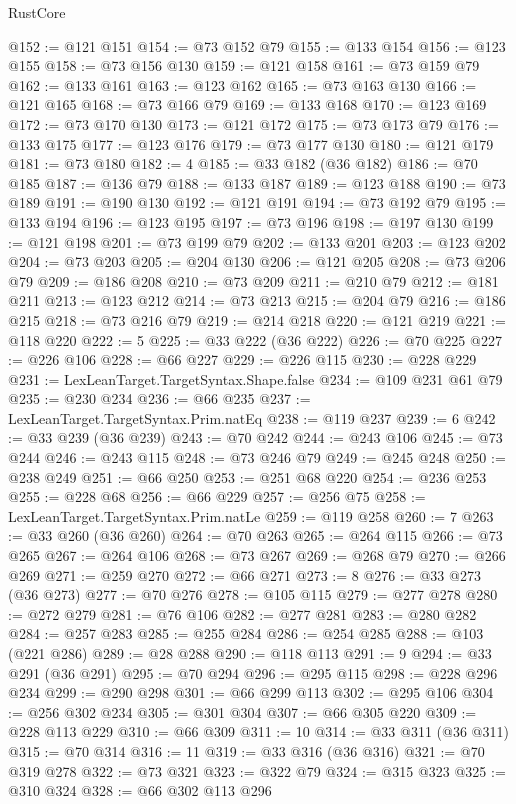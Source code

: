 \begin{lexlean}{RustCore}
\begin{coremodule}
@152 := @121 @151
@154 := @73 @152 @79
@155 := @133 @154
@156 := @123 @155
@158 := @73 @156 @130
@159 := @121 @158
@161 := @73 @159 @79
@162 := @133 @161
@163 := @123 @162
@165 := @73 @163 @130
@166 := @121 @165
@168 := @73 @166 @79
@169 := @133 @168
@170 := @123 @169
@172 := @73 @170 @130
@173 := @121 @172
@175 := @73 @173 @79
@176 := @133 @175
@177 := @123 @176
@179 := @73 @177 @130
@180 := @121 @179
@181 := @73 @180
@182 := 4
@185 := @33 @182 (@36 @182)
@186 := @70 @185
@187 := @136 @79
@188 := @133 @187
@189 := @123 @188
@190 := @73 @189
@191 := @190 @130
@192 := @121 @191
@194 := @73 @192 @79
@195 := @133 @194
@196 := @123 @195
@197 := @73 @196
@198 := @197 @130
@199 := @121 @198
@201 := @73 @199 @79
@202 := @133 @201
@203 := @123 @202
@204 := @73 @203
@205 := @204 @130
@206 := @121 @205
@208 := @73 @206 @79
@209 := @186 @208
@210 := @73 @209
@211 := @210 @79
@212 := @181 @211
@213 := @123 @212
@214 := @73 @213
@215 := @204 @79
@216 := @186 @215
@218 := @73 @216 @79
@219 := @214 @218
@220 := @121 @219
@221 := @118 @220
@222 := 5
@225 := @33 @222 (@36 @222)
@226 := @70 @225
@227 := @226 @106
@228 := @66 @227
@229 := @226 @115
@230 := @228 @229
@231 := LexLeanTarget.TargetSyntax.Shape.false
@234 := @109 @231 @61 @79
@235 := @230 @234
@236 := @66 @235
@237 := LexLeanTarget.TargetSyntax.Prim.natEq
@238 := @119 @237
@239 := 6
@242 := @33 @239 (@36 @239)
@243 := @70 @242
@244 := @243 @106
@245 := @73 @244
@246 := @243 @115
@248 := @73 @246 @79
@249 := @245 @248
@250 := @238 @249
@251 := @66 @250
@253 := @251 @68 @220
@254 := @236 @253
@255 := @228 @68
@256 := @66 @229
@257 := @256 @75
@258 := LexLeanTarget.TargetSyntax.Prim.natLe
@259 := @119 @258
@260 := 7
@263 := @33 @260 (@36 @260)
@264 := @70 @263
@265 := @264 @115
@266 := @73 @265
@267 := @264 @106
@268 := @73 @267
@269 := @268 @79
@270 := @266 @269
@271 := @259 @270
@272 := @66 @271
@273 := 8
@276 := @33 @273 (@36 @273)
@277 := @70 @276
@278 := @105 @115
@279 := @277 @278
@280 := @272 @279
@281 := @76 @106
@282 := @277 @281
@283 := @280 @282
@284 := @257 @283
@285 := @255 @284
@286 := @254 @285
@288 := @103 (@221 @286)
@289 := @28 @288
@290 := @118 @113
@291 := 9
@294 := @33 @291 (@36 @291)
@295 := @70 @294
@296 := @295 @115
@298 := @228 @296 @234
@299 := @290 @298
@301 := @66 @299 @113
@302 := @295 @106
@304 := @256 @302 @234
@305 := @301 @304
@307 := @66 @305 @220
@309 := @228 @113 @229
@310 := @66 @309
@311 := 10
@314 := @33 @311 (@36 @311)
@315 := @70 @314
@316 := 11
@319 := @33 @316 (@36 @316)
@321 := @70 @319 @278
@322 := @73 @321
@323 := @322 @79
@324 := @315 @323
@325 := @310 @324
@328 := @66 @302 @113 @296

\end{coremodule}
\end{lexlean}
